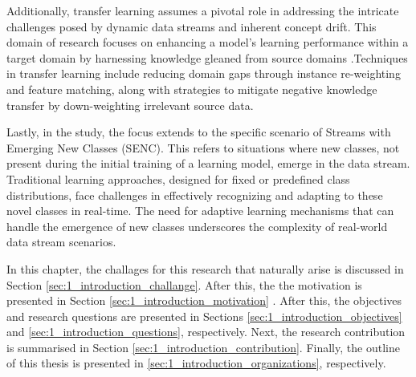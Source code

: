 Additionally, transfer learning assumes a pivotal role in addressing the intricate challenges posed by dynamic data streams and inherent concept drift. This domain of research focuses on enhancing a model's learning performance within a target domain by harnessing knowledge gleaned from source domains \cite{pan2009survey, wang2018systematic}.Techniques in transfer learning include reducing domain gaps through instance re-weighting and feature matching, along with strategies to mitigate negative knowledge transfer by down-weighting irrelevant source data.

Lastly, in the study, the focus extends to the specific scenario of Streams with Emerging New Classes (SENC). This refers to situations where new classes, not present during the initial training of a learning model, emerge in the data stream. Traditional learning approaches, designed for fixed or predefined class distributions, face challenges in effectively recognizing and adapting to these novel classes in real-time. The need for adaptive learning mechanisms that can handle the emergence of new classes underscores the complexity of real-world data stream scenarios.
     

In this chapter, the challages for this research 
that naturally arise is discussed in  Section \ref{sec:1_introduction_challange}. After this, the the motivation is presented in Section \ref{sec:1_introduction_motivation} . After this, the objectives and
research questions are presented in Sections \ref{sec:1_introduction_objectives} and \ref{sec:1_introduction_questions}, respectively. Next, the
research contribution is summarised in Section \ref{sec:1_introduction_contribution}. Finally, the outline of this thesis is presented in
\ref{sec:1_introduction_organizations}, respectively.